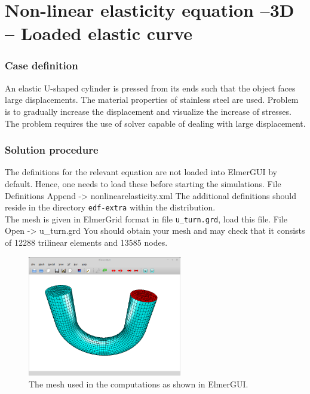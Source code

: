 \chapter{Non-linear elasticity equation --3D -- Loaded elastic curve}



\subsection*{Case definition}

An elastic U-shaped cylinder is pressed from its ends such that
the object faces large displacements. The material properties of
stainless steel are used. Problem is to gradually increase the displacement
and visualize the increase of stresses. The problem requires the use
of solver capable of dealing with large displacement.


\subsection*{Solution procedure}

The definitions for the relevant equation are not loaded into ElmerGUI by default. Hence, 
one needs to load these before starting the simulations.
\ttbegin
File 
  Definitions
    Append -> nonlinearelasticity.xml
\ttend
The additional definitions should reside in the directory \texttt{edf-extra} within the distribution.\\

The mesh is given in ElmerGrid format in file \texttt{u\_turn.grd},
load this file.
\ttbegin
File 
  Open -> u\_turn.grd
\ttend
You should obtain your mesh and may check that it consists of 12288 trilinear elements and 13585 nodes.
\begin{figure}[h!]
\begin{center}
  \includegraphics[width=0.6\textwidth]{UturnElmerGUI}
  \caption{The mesh used in the computations as shown in ElmerGUI.}
  \label{fig:UturnElmerGUI}
\end{center}
\end{figure}

